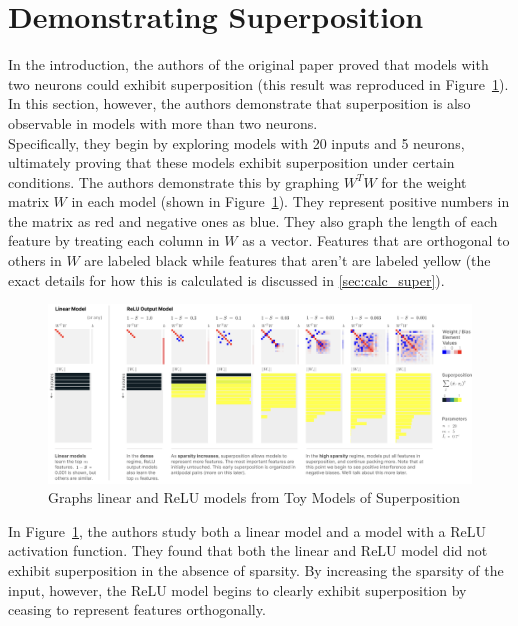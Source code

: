\documentclass{article} %
\begin{document}
\section{Demonstrating Superposition}

In the introduction, the authors of the original paper proved that models with 
two neurons could exhibit superposition (this result was reproduced in Figure~\ref{fig:section3_anthropic}).
In this section, however, the authors demonstrate that superposition
is also observable in models with more than two neurons. \\

Specifically, they begin by exploring models with 20 inputs and 5 neurons, 
ultimately proving that these models exhibit superposition under certain 
conditions. The authors demonstrate this by graphing $W^TW$ for the weight 
matrix $W$ in each model (shown in Figure~\ref{fig:section3_anthropic}). 
They represent positive numbers in the matrix as red and negative ones as blue. They also graph the length 
of each feature by treating each column in $W$ as a vector. Features that are 
orthogonal to others in $W$ are labeled black while features that aren't are labeled yellow
(the exact details for how this is calculated is discussed in \ref{sec:calc_super}).\\

\begin{figure}[h]
    \centering
    \includegraphics[width=0.9\linewidth]{demonstrating_superposition/images/anthropic_section3.png}
    \captionsetup{font=footnotesize} %
    \caption{Graphs linear and ReLU models from Toy Models of Superposition \cite{elhage2022toy}}
    \label{fig:section3_anthropic}
\end{figure}

In Figure~\ref{fig:section3_anthropic}, the authors study both a linear model
and a model with a ReLU activation function. They found that both the linear
and ReLU model did not exhibit superposition in the absence of sparsity. By 
increasing the sparsity of the input, however, the ReLU model begins to clearly 
exhibit superposition by ceasing to represent features orthogonally.\\ 
\end{document}
